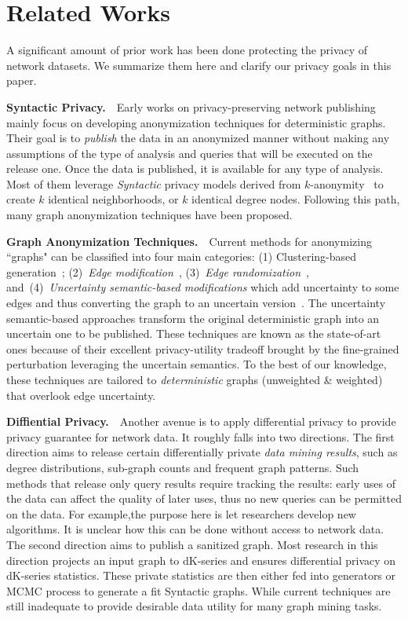 \section{Related Works}
A significant amount of prior work has been done protecting the privacy of network datasets.
We summarize them here and clarify our privacy goals in this paper. 

\textbf{Syntactic Privacy.}~~Early works on privacy-preserving network publishing mainly focus on developing anonymization techniques for deterministic graphs. Their goal is to \emph{publish} the data in an anonymized manner without making any assumptions of the type of analysis and queries that will be executed on the release one. Once the data is published, it is available for any type of analysis. Most of them leverage \emph{Syntactic} privacy models derived from $k$-anonymity~\cite{Sweeney:2002:KAM:774544.774552} to create $k$ identical neighborhoods, or $k$ identical degree nodes. Following this path, many graph anonymization techniques have been proposed.

\textbf{Graph Anonymization Techniques.}~~Current methods for anonymizing ``graphs" can be classified into four main categories: (1) Clustering-based generation~\cite{Hay_Anonymizing_2007,Bhagat_Class_2009,hay2010resisting}; (2)~{\em Edge modification}~\cite{Liu_Towards_2008, Zhou_Preserving_2008, Wang2011, Wu_k_2010, Skarkala_Privacy_2012}, 
(3)~{\em Edge randomization}~\cite{Liu_Privacy_2009,Ying_Randomizing_2008, Ninggal_Utility_2015},
and~(4)~{\em Uncertainty semantic-based modifications} which add uncertainty to some edges and thus converting the graph to an uncertain version~\cite{Boldi_Injecting_2012, Nguyen_Anonymizing_2015}. The uncertainty semantic-based approaches transform the original deterministic graph into an uncertain one to be published. These techniques are known as the state-of-art ones because of their excellent privacy-utility tradeoff brought by the fine-grained perturbation leveraging the uncertain semantics. To the best of our knowledge, these techniques are tailored to \emph{deterministic} graphs (unweighted \& weighted) that overlook edge uncertainty.  

\textbf{Diffiential Privacy.}~~Another avenue is to apply differential privacy to provide privacy guarantee for network data. It roughly falls into two directions. The first direction aims to release certain differentially private \emph{data mining results}, such as degree distributions, sub-graph counts and frequent graph patterns. Such methods that release only query results require tracking the results: early uses of the data can affect the quality of later uses, thus no new queries can be permitted on the data. For example,the purpose here is let researchers develop new algorithms. It is unclear how this can be done without access to network data. The second direction aims to publish a sanitized graph. Most research in this direction projects an input graph to dK-series and ensures differential privacy on dK-series statistics. These private statistics are then either fed into generators or MCMC process to generate a fit Syntactic graphs. While current techniques are still inadequate to provide desirable data utility for many graph mining tasks. 

